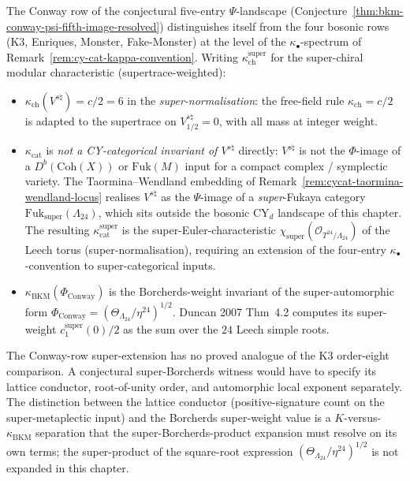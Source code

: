 \begin{remark}
\label{rem:cycat-kappa-spectrum-conway}
The Conway row of the conjectural five-entry $\Psi$-landscape
(Conjecture~\textup{\ref{thm:bkm-conway-psi-fifth-image-resolved}})
distinguishes itself from the four bosonic rows (K3, Enriques,
Monster, Fake-Monster) at the level of the $\kappa_\bullet$-spectrum
of Remark~\textup{\ref{rem:cy-cat-kappa-convention}}. Writing
$\kappa_{\mathrm{ch}}^{\mathrm{super}}$ for the
super-chiral modular characteristic (supertrace-weighted):
\begin{itemize}
 \item $\kappa_{\mathrm{ch}}(V^{s\natural}) = c/2 = 6$ in the
 \emph{super-normalisation}: the free-field rule
 $\kappa_{\mathrm{ch}} = c/2$ is adapted to the supertrace on
 $V^{s\natural}_{1/2} = 0$, with all mass at integer weight.
 \item $\kappa_{\mathrm{cat}}$ is \emph{not a CY-categorical
 invariant of $V^{s\natural}$} directly: $V^{s\natural}$ is not the
 $\Phi$-image of a $D^b(\mathrm{Coh}(X))$ or
 $\mathrm{Fuk}(M)$ input for a compact complex / symplectic
 variety. The Taormina--Wendland embedding of
 Remark~\ref{rem:cycat-taormina-wendland-locus} realises
 $V^{s\natural}$ as the $\Psi$-image of a \emph{super}-Fukaya
 category $\mathrm{Fuk}_{\mathrm{super}}(\Lambda_{24})$,
 which sits outside the bosonic $\mathrm{CY}_d$ landscape of
 this chapter. The resulting $\kappa_{\mathrm{cat}}^{\mathrm{super}}$
 is the super-Euler-characteristic
 $\chi_{\mathrm{super}}(\mathcal{O}_{T^{24}/\Lambda_{24}})$ of
 the Leech torus (super-normalisation), requiring an
 extension of the four-entry $\kappa_\bullet$-convention to
 super-categorical inputs.
 \item $\kappa_{\mathrm{BKM}}(\Phi_{\mathrm{Conway}})$ is
 the Borcherds-weight invariant of the super-automorphic form
 $\Phi_{\mathrm{Conway}} = (\Theta_{\Lambda_{24}}/\eta^{24})^{1/2}$.
 Duncan 2007 Thm~4.2 computes its super-weight $c_1^{\mathrm{super}}(0)/2$
 as the sum over the $24$ Leech simple roots.
\end{itemize}
The Conway-row super-extension has no proved analogue of the K3
order-eight comparison. A conjectural super-Borcherds witness would
have to specify its lattice conductor, root-of-unity order, and
automorphic local exponent separately. The distinction between the
lattice conductor (positive-signature count on the super-metaplectic
input) and the Borcherds super-weight value is a
\(K\)-versus-\(\kappa_{\mathrm{BKM}}\) separation that the
super-Borcherds-product expansion must resolve on its own terms; the
super-product of the square-root expression
$(\Theta_{\Lambda_{24}}/\eta^{24})^{1/2}$ is not expanded in this
chapter.


\end{remark}
